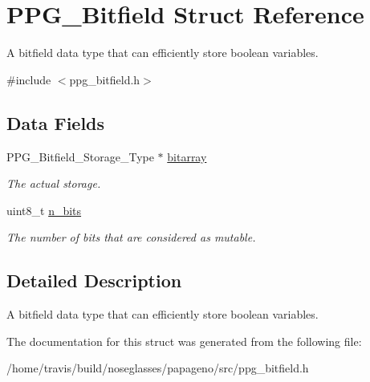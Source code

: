 \hypertarget{structPPG__Bitfield}{\section{P\-P\-G\-\_\-\-Bitfield Struct Reference}
\label{structPPG__Bitfield}
}


A bitfield data type that can efficiently store boolean variables.  




{\ttfamily \#include $<$ppg\-\_\-bitfield.\-h$>$}

\subsection*{Data Fields}
\begin{DoxyCompactItemize}
\item 
\hypertarget{structPPG__Bitfield_aac304bb8f05164dbb6e8e0584bf090f3}{P\-P\-G\-\_\-\-Bitfield\-\_\-\-Storage\-\_\-\-Type $\ast$ \hyperlink{structPPG__Bitfield_aac304bb8f05164dbb6e8e0584bf090f3}{bitarray}}\label{structPPG__Bitfield_aac304bb8f05164dbb6e8e0584bf090f3}

\begin{DoxyCompactList}\small\item\em The actual storage. \end{DoxyCompactList}\item 
\hypertarget{structPPG__Bitfield_a0830d0e25e3d35d7b17c8f8d9cee0c50}{uint8\-\_\-t \hyperlink{structPPG__Bitfield_a0830d0e25e3d35d7b17c8f8d9cee0c50}{n\-\_\-bits}}\label{structPPG__Bitfield_a0830d0e25e3d35d7b17c8f8d9cee0c50}

\begin{DoxyCompactList}\small\item\em The number of bits that are considered as mutable. \end{DoxyCompactList}\end{DoxyCompactItemize}


\subsection{Detailed Description}
A bitfield data type that can efficiently store boolean variables. 

The documentation for this struct was generated from the following file\-:\begin{DoxyCompactItemize}
\item 
/home/travis/build/noseglasses/papageno/src/ppg\-\_\-bitfield.\-h\end{DoxyCompactItemize}
